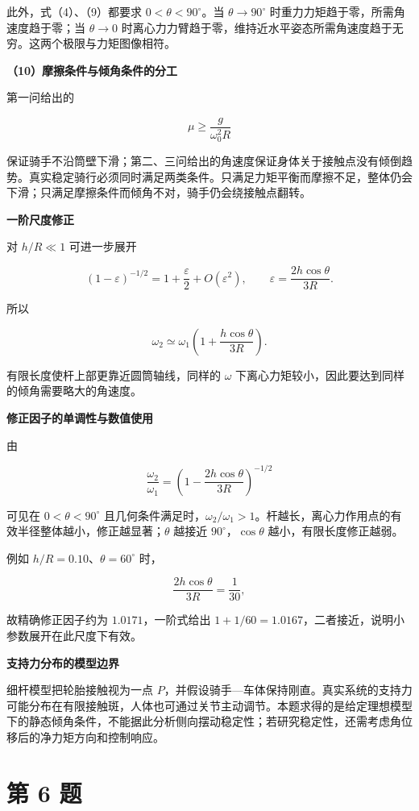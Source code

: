 \documentclass[12pt,a4paper,UTF8]{ctexart}
\begin{document}
此外，式（4）、（9）都要求 \(0<\theta<90^\circ\)。当
\(\theta\to90^\circ\) 时重力力矩趋于零，所需角速度趋于零；当
\(\theta\to0\)
时离心力力臂趋于零，维持近水平姿态所需角速度趋于无穷。这两个极限与力矩图像相符。

\textbf{（10）摩擦条件与倾角条件的分工}

第一问给出的

\[
\mu\geq\frac{g}{\omega_0^2R}
\]

保证骑手不沿筒壁下滑；第二、三问给出的角速度保证身体关于接触点没有倾倒趋势。真实稳定骑行必须同时满足两类条件。只满足力矩平衡而摩擦不足，整体仍会下滑；只满足摩擦条件而倾角不对，骑手仍会绕接触点翻转。

\textbf{一阶尺度修正}

对 \(h/R\ll1\) 可进一步展开

\[
(1-\varepsilon)^{-1/2}
=1+\frac\varepsilon2+O(\varepsilon^2),
\qquad
\varepsilon=\frac{2h\cos\theta}{3R}.
\]

所以

\[
\omega_2
\simeq\omega_1
\left(1+\frac{h\cos\theta}{3R}\right).
\]

有限长度使杆上部更靠近圆筒轴线，同样的 \(\omega\)
下离心力矩较小，因此要达到同样的倾角需要略大的角速度。

\textbf{修正因子的单调性与数值使用}

由

\[
\frac{\omega_2}{\omega_1}
=\left(1-\frac{2h\cos\theta}{3R}\right)^{-1/2}
\]

可见在 \(0<\theta<90^\circ\)
且几何条件满足时，\(\omega_2/\omega_1>1\)。杆越长，离心力作用点的有效半径整体越小，修正越显著；\(\theta\)
越接近 \(90^\circ\)，\(\cos\theta\) 越小，有限长度修正越弱。

例如 \(h/R=0.10\)、\(\theta=60^\circ\) 时，

\[
\frac{2h\cos\theta}{3R}=\frac1{30},
\]

故精确修正因子约为 \(1.0171\)，一阶式给出
\(1+1/60=1.0167\)，二者接近，说明小参数展开在此尺度下有效。

\textbf{支持力分布的模型边界}

细杆模型把轮胎接触视为一点
\(P\)，并假设骑手---车体保持刚直。真实系统的支持力可能分布在有限接触斑，人体也可通过关节主动调节。本题求得的是给定理想模型下的静态倾角条件，不能据此分析侧向摆动稳定性；若研究稳定性，还需考虑角位移后的净力矩方向和控制响应。

\newpage

\section{第 6 题}\label{ux7b2c-6-ux9898}
\end{document}
